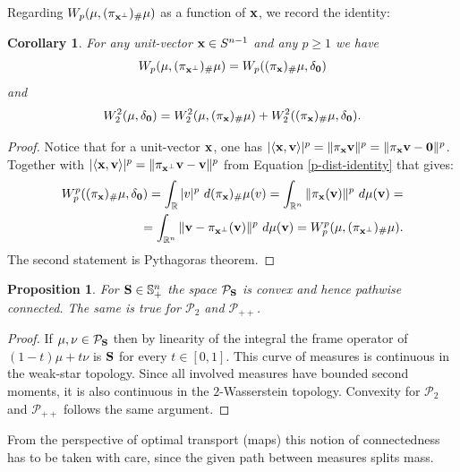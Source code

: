 \documentclass{amsart}
\numberwithin{equation}{section}
\newcommand\cP{{\mathcal P}}
\newcommand\bS{{\bf S}}
\newcommand\R{{\mathbb R}}
\theoremstyle{plain}
\newtheorem{proposition}[subsection]{Proposition}
\newtheorem{corollary}[subsection]{Corollary}
\theoremstyle{definition}
\begin{document}
Regarding $W_p(\mu, ( \pi_{{\bf x}^{\perp}})_{\#}\mu)$ as a function of ${\bf x}$, we record the identity: 
\begin{corollary}
For any unit-vector ${\bf x} \in S^{n-1}$ and any $p \geq 1$ we have 
\begin{equation}\label{delta-wasser}
W_p(\mu, ( \pi_{{\bf x}^{\perp}})_{\#}\mu)=W_p( (\pi_{{\bf x}})_{\#}\mu, \delta_{{\bf 0}})
\end{equation}
and 
$$W^2_2(\mu, \delta_{{\bf 0}})=W^2_2(\mu, (\pi_{{\bf x}})_{\#}\mu) + W_2^2( (\pi_{{\bf x}})_{\#}\mu, \delta_{{\bf 0}}).$$
\end{corollary}
\begin{proof}
Notice that for a unit-vector ${\bf x}$, one has $|\langle {\bf x}, {\bf v} \rangle|^p= \|\pi_{{\bf x}}{\bf v}\|^p =\|\pi_{{\bf x}}{\bf v}-{\bf 0}\|^p$.  
Together with $|\langle {\bf x}, {\bf v} \rangle|^p= \|\pi_{{\bf x}^{\perp}}{\bf v}-{\bf v}\|^p$ from Equation \ref{p-dist-identity} that gives: 
\begin{equation}
\begin{split}
W^p_p(( \pi_{{\bf x}})_{\#}\mu, \delta_{{\bf 0}})=\int_{\R} | v |^p   \ d (\pi_{{\bf x}})_{\#}\mu(v)=
\int_{\R^n} \|\pi_{{\bf x}}({\bf v})\|^p   \ d \mu({\bf v})=\\
=\int_{\R^n}\|{\bf v}- \pi_{{\bf x}^{\perp}}({\bf v})\|^p\ d \mu({\bf v})=W^p_p(\mu, (\pi_{{\bf x}^{\perp}})_{\#}\mu).
\end{split}
\end{equation}
The second statement is Pythagoras theorem. 
\end{proof}






\begin{proposition}
For $\bS \in {\mathbb S}^n_{+}$ the space $\cP_{\bS}$ is convex and hence pathwise connected. The same is true for $\cP_2$ and $\cP_{++}$. 
\end{proposition}
\begin{proof}
If $\mu, \nu \in \cP_{\bS}$ then by linearity of the integral the frame operator of $(1-t)\mu+t\nu$ is $\bS$ for every $t \in [0,1]$. 
This curve of measures is continuous in the weak-star topology. Since all involved measures have bounded second moments, it is also 
continuous in the $2$-Wasserstein topology. Convexity for $\cP_2$ and $\cP_{++}$ follows the same argument. 
\end{proof}
From the perspective of optimal transport (maps) this notion of connectedness has to be taken with care, since the given 
path between measures splits mass.  
\end{document}
